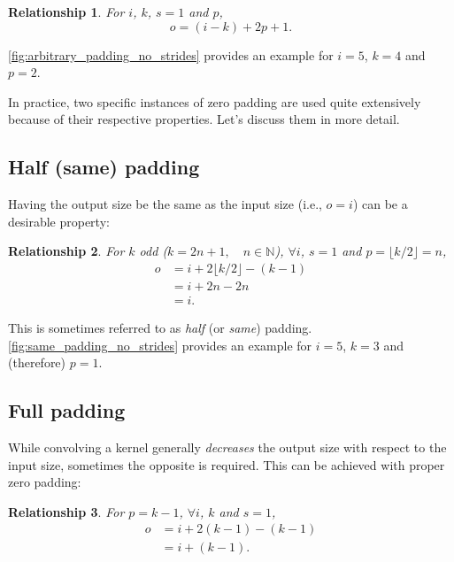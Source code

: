 \documentclass[notitlepage]{report}
\newtheorem{relationship}{Relationship}
\begin{document}
\begin{relationship}\label{rel:arbitrary_padding_no_strides}
For $i$, $k$, $s = 1$ and $p$,
\begin{equation*}
    o = (i - k) + 2p + 1.
\end{equation*}
\end{relationship}

\noindent \autoref{fig:arbitrary_padding_no_strides} provides an example for $i
= 5$, $k = 4$ and $p = 2$.

In practice, two specific instances of zero padding are used quite extensively
because of their respective properties. Let's discuss them in more detail.

\subsection{Half (same) padding}

Having the output size be the same as the input size (i.e., $o = i$) can be a
desirable property:

\begin{relationship}\label{rel:same_padding_no_strides}
For $k$ odd ($k = 2n + 1, \quad n \in \mathbb{N}$), $\forall i$, $s = 1$ and
$p = \lfloor k / 2 \rfloor = n$,
\begin{equation*}
\begin{split}
    o &= i + 2 \lfloor k / 2 \rfloor - (k - 1) \\
      &= i + 2n - 2n \\
      &= i.
\end{split}
\end{equation*}
\end{relationship}

\noindent This is sometimes referred to as {\em half} (or {\em same}) padding.
\autoref{fig:same_padding_no_strides} provides an example for $i = 5$, $k = 3$
and (therefore) $p = 1$.

\subsection{Full padding}

While convolving a kernel generally {\em decreases} the output size with respect
to the input size, sometimes the opposite is required. This can be achieved
with proper zero padding:

\begin{relationship}\label{rel:full_padding_no_strides}
For $p = k - 1$, $\forall i$, $k$ and $s = 1$,
\begin{equation*}
\begin{split}
    o &= i + 2(k - 1) - (k - 1) \\
      &= i + (k - 1).
\end{split}
\end{equation*}
\end{relationship}
\end{document}

